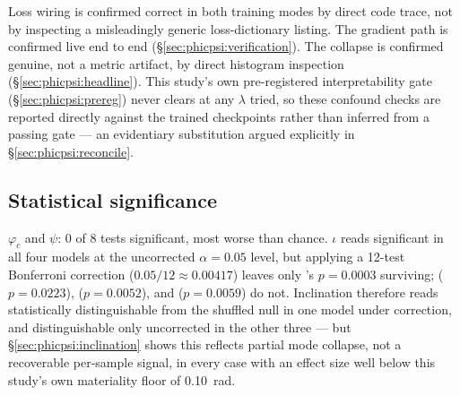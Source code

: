 Loss wiring is confirmed correct in both training modes by direct code trace, not by inspecting a misleadingly generic loss-dictionary listing.
The gradient path is confirmed live end to end (\S\ref{sec:phicpsi:verification}).
The collapse is confirmed genuine, not a metric artifact, by direct histogram inspection (\S\ref{sec:phicpsi:headline}).
This study's own pre-registered interpretability gate (\S\ref{sec:phicpsi:prereg}) never clears at any $\lambda$ tried, so these confound checks are reported directly against the trained checkpoints rather than inferred from a passing gate --- an evidentiary substitution argued explicitly in \S\ref{sec:phicpsi:reconcile}.

\subsection{Statistical significance}
\label{sec:phicpsi:bootstrap}

\begin{table}[tbp]
    \centering
    \caption{Label-permutation bootstrap ($N=10{,}000$, one-sided). $z>0$: better than shuffled-null.}
    \label{tab:bootstrap}
\end{table}

$\varphi_c$ and $\psi$: 0 of 8 tests significant, most worse than chance.
$\iota$ reads significant in all four models at the uncorrected $\alpha=0.05$ level, but applying a 12-test Bonferroni correction ($0.05/12\approx0.00417$) leaves only \cnnAttn's $p=0.0003$ surviving; \pocA ($p=0.0223$), \pocB ($p=0.0052$), and \Tcn ($p=0.0059$) do not.
Inclination therefore reads statistically distinguishable from the shuffled null in one model under correction, and distinguishable only uncorrected in the other three --- but \S\ref{sec:phicpsi:inclination} shows this reflects partial mode collapse, not a recoverable per-sample signal, in every case with an effect size well below this study's own materiality floor of 0.10~rad.

